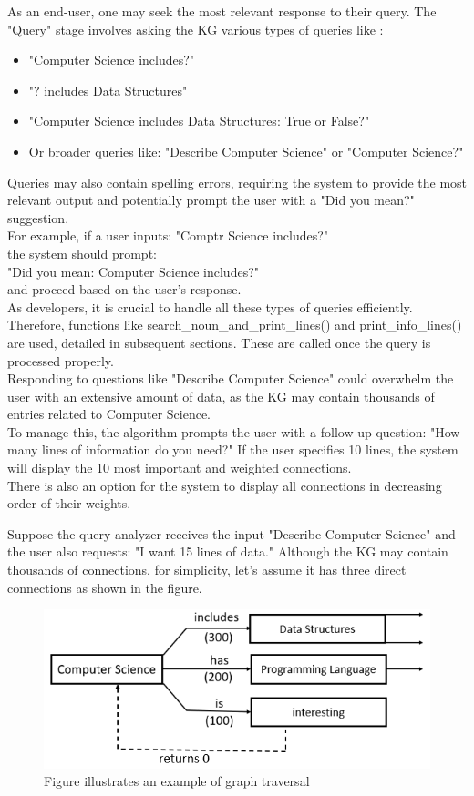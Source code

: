 \documentclass[conference]{IEEEtran}
\begin{document}
As an end-user, one may seek the most relevant response to their query. The "Query" stage involves asking the KG various types of queries like :
\begin{itemize}
    \item "Computer Science includes?"
    \item "? includes Data Structures"
    \item "Computer Science includes Data Structures: True or False?"
    \item Or broader queries like: "Describe Computer Science" or "Computer Science?"
\end{itemize}

Queries may also contain spelling errors, requiring the system to provide the most relevant output and potentially prompt the user with a "Did you mean?" suggestion.
\\
For example, if a user inputs: "Comptr Science includes?" 
\\the system should prompt:
\\
"Did you mean: Computer Science includes?" 
\\
and proceed based on the user's response.
\\

As developers, it is crucial to handle all these types of queries efficiently. Therefore, functions like search\_noun\_and\_print\_lines() and print\_info\_lines() are used, detailed in subsequent sections.
These are called once the query is processed properly.
\\

Responding to questions like "Describe Computer Science" could overwhelm the user with an extensive amount of data, as the KG may contain thousands of entries related to Computer Science. \\
To manage this, the algorithm prompts the user with a follow-up question: "How many lines of information do you need?" If the user specifies 10 lines, the system will display the 10 most important and weighted connections. 
\\
There is also an option for the system to display all connections in decreasing order of their weights.


Suppose the query analyzer receives the input "Describe Computer Science" and the user also requests: "I want 15 lines of data."
Although the KG may contain thousands of connections, for simplicity, let's assume it has three direct connections as shown in the figure.

\begin{figure}[htbp]
\centering
\includegraphics[width=0.9\linewidth]{kg_explanation_example.png}
\caption{Figure illustrates an example of graph traversal}
\label{fig}
\end{figure}
\end{document}
